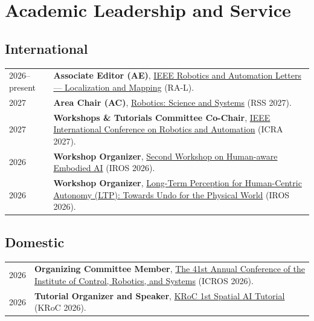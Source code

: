 \documentclass[10pt,a4paper]{article}
\newcommand{\daterow}[2]{#1 & #2 \\[2.2pt]}
\begin{document}
\section{Academic Leadership and Service}
\subsection{International}
\begin{tabularx}{\textwidth}{@{}L{34mm}Y@{}}
\daterow{2026--present}{\textbf{Associate Editor (AE)}, \href{https://www.ieee-ras.org/publications/ra-l}{IEEE Robotics and Automation Letters — Localization and Mapping} (RA-L).}
\daterow{2027}{\textbf{Area Chair (AC)}, \href{https://roboticsconference.org/}{Robotics: Science and Systems} (RSS 2027).}
\daterow{2027}{\textbf{Workshops \& Tutorials Committee Co-Chair}, \href{https://2027.ieee-icra.org/about/committee/\#:~:text=Workshops\%20\%26\%20Tutorials\%20Committee}{IEEE International Conference on Robotics and Automation} (ICRA 2027).}
\daterow{2026}{\textbf{Workshop Organizer}, \href{https://heai-iros26-workshop.github.io/}{Second Workshop on Human-aware Embodied AI} (IROS 2026).}
\daterow{2026}{\textbf{Workshop Organizer}, \href{https://mit-spark.github.io/Longterm-Perception-WS/}{Long-Term Perception for Human-Centric Autonomy (LTP): Towards Undo for the Physical World} (IROS 2026).}
\end{tabularx}

\subsection{Domestic}
\begin{tabularx}{\textwidth}{@{}L{34mm}Y@{}}
\daterow{2026}{\textbf{Organizing Committee Member}, \href{https://gisbi-kim.github.io/icros2026-explorer/}{The 41st Annual Conference of the Institute of Control, Robotics, and Systems} (ICROS 2026).}
\daterow{2026}{\textbf{Tutorial Organizer and Speaker}, \href{https://sites.google.com/view/kroc26-spatial-ai-tutorial/home}{KRoC 1st Spatial AI Tutorial} (KRoC 2026).}
\end{tabularx}

\end{document}
